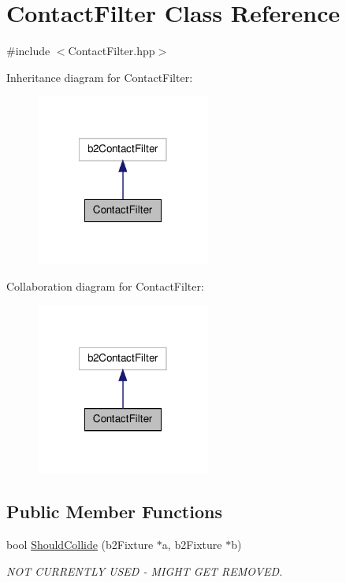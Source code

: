 \hypertarget{class_contact_filter}{\section{Contact\-Filter Class Reference}
\label{class_contact_filter}
}


{\ttfamily \#include $<$Contact\-Filter.\-hpp$>$}



Inheritance diagram for Contact\-Filter\-:\nopagebreak
\begin{figure}[H]
\begin{center}
\leavevmode
\includegraphics[width=162pt]{class_contact_filter__inherit__graph}
\end{center}
\end{figure}


Collaboration diagram for Contact\-Filter\-:\nopagebreak
\begin{figure}[H]
\begin{center}
\leavevmode
\includegraphics[width=162pt]{class_contact_filter__coll__graph}
\end{center}
\end{figure}
\subsection*{Public Member Functions}
\begin{DoxyCompactItemize}
\item 
bool \hyperlink{class_contact_filter_aa1f43a83fda36c0d4e0479e370350585}{Should\-Collide} (b2\-Fixture $\ast$a, b2\-Fixture $\ast$b)
\begin{DoxyCompactList}\small\item\em N\-O\-T C\-U\-R\-R\-E\-N\-T\-L\-Y U\-S\-E\-D -\/ M\-I\-G\-H\-T G\-E\-T R\-E\-M\-O\-V\-E\-D. \end{DoxyCompactList}\end{DoxyCompactItemize}


